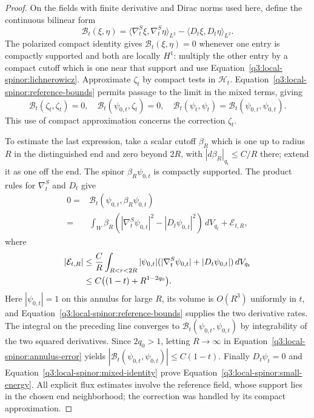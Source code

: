 \begin{proof}
On the fields with finite derivative and Dirac norms used here,
define the continuous bilinear form
\[
 \mathcal B_t(\xi,\eta)
  =\langle\nabla^S_t\xi,\nabla^S_t\eta\rangle_{L^2}
       -\langle D_t\xi,D_t\eta\rangle_{L^2}.
\]
The polarized compact identity gives $\mathcal B_t(\xi,\eta)=0$
whenever one entry is compactly supported and both are locally
$H^1$: multiply the other entry by a compact cutoff which is
one near that support and use
Equation~\eqref{q3:local-spinor:lichnerowicz}.  Approximate
$\zeta_t$ by compact tests in $\mathcal H_t$.
Equation~\eqref{q3:local-spinor:reference-bounds} permits passage to the
limit in the mixed terms, giving
\begin{equation}\label{q3:local-spinor:mixed-identity}
 \mathcal B_t(\zeta_t,\zeta_t)=0,
 \quad \mathcal B_t(\psi_{0,t},\zeta_t)=0,
 \quad
 \mathcal B_t(\psi_t,\psi_t)
       =\mathcal B_t(\psi_{0,t},\psi_{0,t}).
\end{equation}
This use of compact approximation concerns the correction
$\zeta_t$.

To estimate the last expression, take a scalar cutoff $\beta_R$
which is one up to radius $R$ in the distinguished end and zero
beyond $2R$, with $|d\beta_R|_{q_t}\le C/R$ there; extend it
as one off the end.  The spinor $\beta_R\psi_{0,t}$ is compactly
supported.  The product rules for $\nabla^S_t$ and $D_t$ give
\begin{align*}
 0={}&\mathcal B_t(\psi_{0,t},\beta_R\psi_{0,t})\\
   ={}&\int_W\beta_R
       (|\nabla^S_t\psi_{0,t}|^2-|D_t\psi_{0,t}|^2)\,dV_{q_t}
       +\mathcal E_{t,R},
\end{align*}
where
\begin{align}
 |\mathcal E_{t,R}|
 &\le\frac C R\int_{R<r<2R}|\psi_{0,t}|
       (|\nabla^S_t\psi_{0,t}|+|D_t\psi_{0,t}|)\,dV_{q_t}
       \notag\\
 &\le C\bigl((1-t)+R^{1-2q_0}\bigr).
       \label{q3:local-spinor:annulus-error}
\end{align}
Here $|\psi_{0,t}|=1$ on this annulus for large $R$, its
volume is $O(R^3)$ uniformly in $t$, and
Equation~\eqref{q3:local-spinor:reference-bounds} supplies the two
derivative rates.  The integral on the preceding line converges
to $\mathcal B_t(\psi_{0,t},\psi_{0,t})$ by integrability of
the two squared derivatives.  Since $2q_0>1$, letting
$R\to\infty$ in Equation~\eqref{q3:local-spinor:annulus-error} yields
$|\mathcal B_t(\psi_{0,t},\psi_{0,t})|\le C(1-t)$.
Finally $D_t\psi_t=0$ and
Equation~\eqref{q3:local-spinor:mixed-identity} prove
Equation~\eqref{q3:local-spinor:small-energy}.
All explicit flux estimates involve the reference field, whose
support lies in the chosen end neighborhood; the correction was
handled by its compact approximation.
\end{proof}

